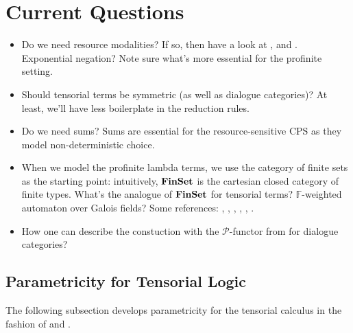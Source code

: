 \documentclass[8pt]{article}
\theoremstyle{definition}
\theoremstyle{definition}
\theoremstyle{definition}
\theoremstyle{definition}
\theoremstyle{definition}
\theoremstyle{definition}
\theoremstyle{definition}
\theoremstyle{definition}
\theoremstyle{definition}
\theoremstyle{definition}
\theoremstyle{definition}
\theoremstyle{definition}
\theoremstyle{definition}
\theoremstyle{definition}
\theoremstyle{question}
\begin{document}
\section{Current Questions}
\begin{itemize}
  \item Do we need resource modalities? If so, then have a look at \cite{mellies2010resource}, \cite{mellies2018explicit}
  and \cite{mellies2007resource}. Exponential negation? Note sure what's more essential for the profinite setting.
  \item Should tensorial terms be symmetric (as well as dialogue categories)? At least, we'll have less boilerplate in
  the reduction rules.
  \item Do we need sums? Sums are essential for the resource-sensitive CPS as they model non-deterministic choice.
  \item When we model the profinite lambda terms, we use the category of finite sets as the starting point:
  intuitively, ${\bf FinSet}$ is the cartesian closed category of finite types. 
  What's the analogue of ${\bf FinSet}$ for tensorial terms? $\mathbb{F}$-weighted automaton over Galois fields?
  Some references: \cite{berstel2011noncommutative}, \cite{moreau2023syntactically}, \cite{adamek2018categorical},
  \cite{urbat2016eilenberg}, \cite{bonchi2012coalgebraic}, \cite{valiron2014modeling}.
  \item How one can describe the constuction with the $\mathcal{P}$-functor from \cite{jacq2018categorical} for dialogue categories?
\end{itemize}

\subsection{Parametricity for Tensorial Logic}

The following subsection develops parametricity for the tensorial calculus in the fashion of \cite{aberle2025substructural}
and \cite{zhao2010relational}.

 

\end{document}
